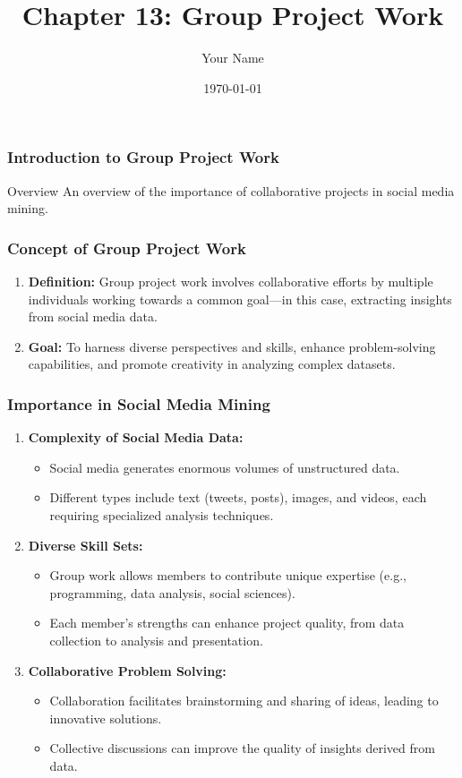 \documentclass{beamer}
\title{Chapter 13: Group Project Work}
\author{Your Name}
\institute{Your Institution}
\date{\today}
\begin{document}
\frame{\titlepage}

\begin{frame}[fragile]
    \frametitle{Introduction to Group Project Work}
    \begin{block}{Overview}
        An overview of the importance of collaborative projects in social media mining.
    \end{block}
\end{frame}

\begin{frame}[fragile]
    \frametitle{Concept of Group Project Work}
    \begin{enumerate}
        \item \textbf{Definition:} 
            Group project work involves collaborative efforts by multiple individuals working towards a common goal—in this case, extracting insights from social media data.
        \item \textbf{Goal:} 
            To harness diverse perspectives and skills, enhance problem-solving capabilities, and promote creativity in analyzing complex datasets.
    \end{enumerate}
\end{frame}

\begin{frame}[fragile]
    \frametitle{Importance in Social Media Mining}
    \begin{enumerate}
        \item \textbf{Complexity of Social Media Data:}
            \begin{itemize}
                \item Social media generates enormous volumes of unstructured data.
                \item Different types include text (tweets, posts), images, and videos, each requiring specialized analysis techniques.
            \end{itemize}
        \item \textbf{Diverse Skill Sets:}
            \begin{itemize}
                \item Group work allows members to contribute unique expertise (e.g., programming, data analysis, social sciences).
                \item Each member's strengths can enhance project quality, from data collection to analysis and presentation.
            \end{itemize}
        \item \textbf{Collaborative Problem Solving:}
            \begin{itemize}
                \item Collaboration facilitates brainstorming and sharing of ideas, leading to innovative solutions.
                \item Collective discussions can improve the quality of insights derived from data.
            \end{itemize}
    \end{enumerate}
\end{frame}
\end{document}

